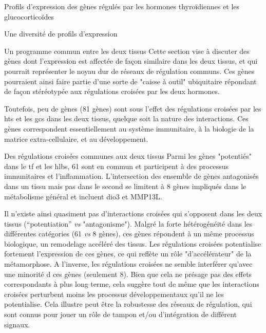 \documentclass[../main.tex]{subfiles}
\begin{document}
\begin{chapter}{Profils d'expression des gènes régulés par les hormones thyroïdiennes et les glucocorticoïdes}
\begin{section}{Une diversité de profils d'expression}
\begin{subsection}{Un programme commun entre les deux tissus}
Cette section vise à discuter des gènes dont l'expression est affectée de façon similaire dans les deux tissus, et qui pourrait représenter le noyau dur de réseaux de régulation communs.
Ces gènes pourraient ainsi faire partie d'une sorte de "caisse à outil" ubiquitaire répondant de façon stéréotypée aux régulations croisées par les deux hormones.
\par
Toutefois, peu de gènes (81 gènes) sont sous l'effet des régulations croisées par les \glspl{ht} et les \glspl{gc} dans les deux tissus, quelque soit la nature des interactions.
Ces gènes correspondent essentiellement au système immunitaire, à la biologie de la matrice extra-cellulaire, et au développement.

\begin{subsubsection}{Des régulations croisées communes aux deux tissus}
Parmi les gènes "potentiés" dans le \gls{tf} et les \glspl{hlb}, 61 sont en commun et participent à des processus immunitaires et l'inflammation.
L'intersection des ensemble de gènes antagonisés dans un tissu mais pas dans le second se limitent à 8 gènes impliqués dans le métabolisme général et incluent \gls{dio3} et MMP13L.
\par
Il n'existe ainsi quasiment pas d'interactions croisées qui s'opposent dans les deux tissus (``potentiation'' \textit{vs} "antagonisme").
Malgré la forte hétérogénéité dans les différentes catégories (61 \textit{vs} 8 gènes), ces gènes répondent à un même processus biologique, un remodelage accéléré des tissus.
Les régulations croisées potentialise fortement l'expression de ces gènes, ce qui reflète un rôle "d'accélérateur" de la métamorphose.
A l'inverse, les régulations croisées ne semble interférer qu'avec une minorité d ces gènes (seulement 8).
Bien que cela ne présage pas des effets correspondants à plus long terme, cela suggère tout de même que les interactions croisées perturbent moins les processus développementaux qu'il ne les potentialise.
Cela illustre peut être la robustesse des réseaux de régulation, qui sont connus pour jouer un rôle de tampon et/ou d'intégration de différent signaux.
\end{subsubsection}


\end{subsection}
\end{section}
\end{chapter}
\end{document}
